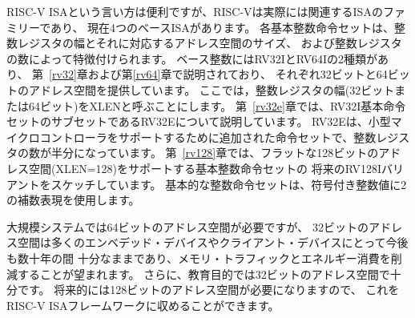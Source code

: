 RISC-V ISAという言い方は便利ですが、RISC-Vは実際には関連するISAのファミリーであり、
現在4つのベースISAがあります。 
各基本整数命令セットは、整数レジスタの幅とそれに対応するアドレス空間のサイズ、
および整数レジスタの数によって特徴付けられます。 
ベース整数にはRV32IとRV64Iの2種類があり、
第~\ref{rv32}章および第\ref{rv64}章で説明されており、
それぞれ32ビットと64ビットのアドレス空間を提供しています。
ここでは，整数レジスタの幅(32ビットまたは64ビット)をXLENと呼ぶことにします。
第~\ref{rv32e}章では、RV32I基本命令セットのサブセットであるRV32Eについて説明しています。
RV32Eは、小型マイクロコントローラをサポートするために追加された命令セットで、整数レジスタの数が半分になっています。
第~\ref{rv128}章では、フラットな128ビットのアドレス空間(XLEN=128)をサポートする基本整数命令セットの
将来のRV128Iバリアントをスケッチしています。
基本的な整数命令セットは、符号付き整数値に2の補数表現を使用します。

\begin{commentary}
大規模システムでは64ビットのアドレス空間が必要ですが、
32ビットのアドレス空間は多くのエンベデッド・デバイスやクライアント・デバイスにとって今後も数十年の間
十分なままであり、メモリ・トラフィックとエネルギー消費を削減することが望まれます。
さらに、教育目的では32ビットのアドレス空間で十分です。
将来的には128ビットのアドレス空間が必要になりますので、
これをRISC-V ISAフレームワークに収めることができます。
\end{commentary}

